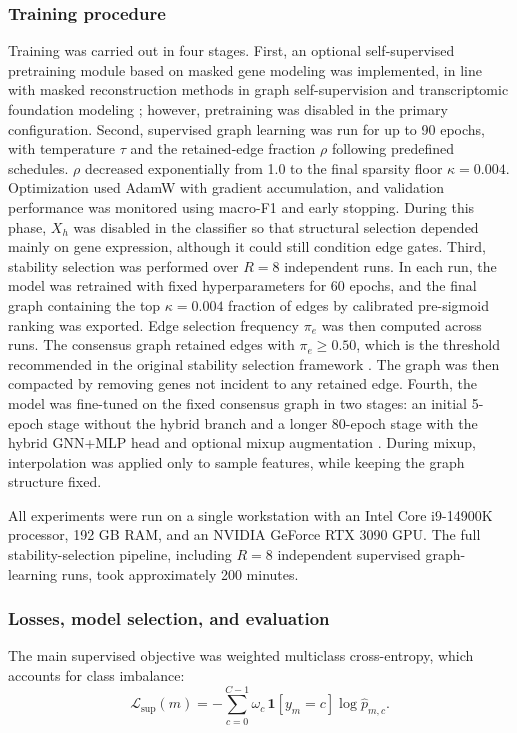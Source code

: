 \documentclass[unnumsec,webpdf,modern,large]{oup-authoring-template}
\begin{document}
\subsubsection{Training procedure}
\label{subsec:training_procedure}
Training was carried out in four stages. First, an optional self-supervised pretraining module based on masked gene modeling was implemented, in line with masked reconstruction methods in graph self-supervision and transcriptomic foundation modeling \citep{Hou2022GraphMAE,Theodoris2023Geneformer}; however, pretraining was disabled in the primary configuration. Second, supervised graph learning was run for up to 90 epochs, with temperature \(\tau\) and the retained-edge fraction \(\rho\) following predefined schedules. \(\rho\) decreased exponentially from 1.0 to the final sparsity floor \(\kappa=0.004\). Optimization used AdamW \citep{Kingma2015Adam,Loshchilov2019AdamW} with gradient accumulation, and validation performance was monitored using macro-F1 and early stopping. During this phase, \(X_h\) was disabled in the classifier so that structural selection depended mainly on gene expression, although it could still condition edge gates. Third, stability selection was performed over \(R=8\) independent runs. In each run, the model was retrained with fixed hyperparameters for 60 epochs, and the final graph containing the top \(\kappa=0.004\) fraction of edges by calibrated pre-sigmoid ranking was exported. Edge selection frequency \(\pi_e\) was then computed across runs. The consensus graph retained edges with \(\pi_e \ge 0.50\), which is the threshold recommended in the original stability selection framework \citep{Meinshausen2010Stability}. The graph was then compacted by removing genes not incident to any retained edge. Fourth, the model was fine-tuned on the fixed consensus graph in two stages: an initial 5-epoch stage without the hybrid branch and a longer 80-epoch stage with the hybrid GNN+MLP head and optional mixup augmentation \citep{Zhang2018Mixup}. During mixup, interpolation was applied only to sample features, while keeping the graph structure fixed.

All experiments were run on a single workstation with an Intel Core i9-14900K processor, 192 GB RAM, and an NVIDIA GeForce RTX 3090 GPU. The full stability-selection pipeline, including \(R=8\) independent supervised graph-learning runs, took approximately 200 minutes.


\subsubsection{Losses, model selection, and evaluation} 
The main supervised objective was weighted multiclass cross-entropy, which accounts for class imbalance:
\[
\mathcal{L}_{\mathrm{sup}}(m)= -\sum_{c=0}^{C-1}\omega_c\,\mathbf{1}[y_m=c]\log \hat p_{m,c}.
\]
\end{document}
